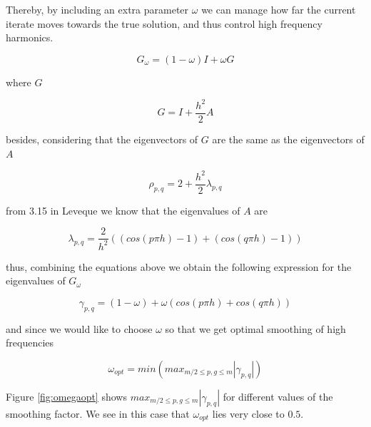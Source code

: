 \documentclass[main.tex]{subfiles}
\begin{document}
Thereby, by including an extra parameter $\omega$ we can manage how far the current iterate moves towards the true solution, and thus control high frequency harmonics.

\begin{equation}
G_\omega = (1-\omega)I + \omega G
\end{equation} 

where $G$

\begin{equation}
G = I + \frac{h^2}{2} A
\end{equation}

besides, considering that the eigenvectors of $G$ are the same as the eigenvectors of $A$

\begin{equation}
\rho_{p,q} = 2 + \frac{h^2}{2} \lambda_{p,q}
\end{equation}

from 3.15 in Leveque we know that the eigenvalues of $A$ are

\begin{equation}
\lambda_{p,q} = \frac{2}{h^2}((cos(p \pi h) -1) + (cos(q \pi h) -1 ))
\end{equation}

thus, combining the equations above we obtain the following expression for the eigenvalues of $G_\omega$

\begin{equation}
\gamma_{p,q} = (1-\omega) + \omega ( cos(p \pi h) + cos(q \pi h))
\end{equation}

and since we would like to choose $\omega$ so that we get optimal smoothing of high frequencies

\begin{equation}
\omega_{opt} = min ( max_{m/2 \leq p,g \leq m} |\gamma_{p,q}|)
\end{equation}

Figure \ref{fig:omegaopt} shows $max_{m/2 \leq p,g \leq m} |\gamma_{p,q}|$ for different values of the smoothing factor. We see in this case that $\omega_{opt}$ lies very close to $0.5$.
\end{document}
